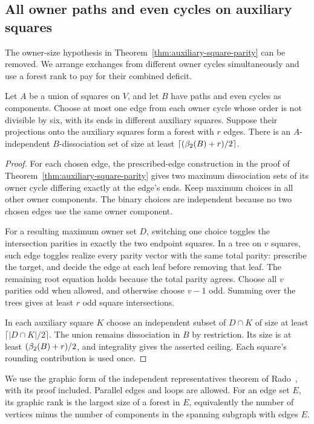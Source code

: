 \subsection{All owner paths and even cycles on auxiliary squares}

The owner-size hypothesis in Theorem~\ref{thm:auxiliary-square-parity} can be
removed. We arrange exchanges from different owner cycles simultaneously and
use a forest rank to pay for their combined deficit.

\begin{lemma}\label{lem:square-exchange-forest}
Let $A$ be a union of squares on $V$, and let $B$ have paths and even cycles
as components. Choose at most one edge from each owner cycle whose order is
not divisible by six, with its ends in different auxiliary squares.
Suppose their projections onto the auxiliary squares form a forest with
$r$ edges. There is an $A$-independent $B$-dissociation set of size at least
$\lceil(\beta_2(B)+r)/2\rceil$.
\end{lemma}
\begin{proof}
For each chosen edge, the prescribed-edge construction in the proof of
Theorem~\ref{thm:auxiliary-square-parity} gives two maximum dissociation sets
of its owner cycle differing exactly at the edge's ends. Keep maximum choices
in all other owner components. The binary choices are independent because
no two chosen edges use the same owner component.

For a resulting maximum owner set $D$, switching one choice toggles the
intersection parities in exactly the two endpoint squares. In a tree on $v$
squares, such edge toggles realize every parity vector with the same total
parity: prescribe the target, and decide the edge at each leaf before removing
that leaf. The remaining root equation holds because the total parity agrees.
Choose all $v$ parities odd when allowed, and otherwise choose $v-1$ odd.
Summing over the trees gives at least $r$ odd square intersections.

In each auxiliary square $K$ choose an independent subset of $D\cap K$ of
size at least $\lceil|D\cap K|/2\rceil$. The union remains dissociation in $B$
by restriction. Its size is at least $(\beta_2(B)+r)/2$, and integrality gives
the asserted ceiling. Each square's rounding contribution is used once.
\end{proof}

We use the graphic form of the independent representatives theorem of
Rado~\cite{Rado42}, with its proof included. Parallel edges and loops are
allowed. For an edge set $E$, its graphic rank is the largest size of a forest
in $E$, equivalently the number of vertices minus the number of components
in the spanning subgraph with edges $E$.

